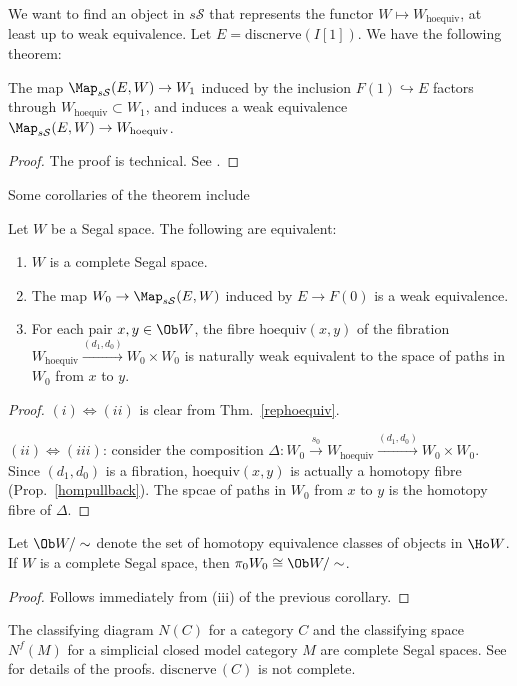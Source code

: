 We want to find an object in $s\mathcal S$ that represents the functor $W\mapsto W_{\mathrm{hoequiv}}$, at least up to weak equivalence. Let $E=\mathrm{discnerve}(I[1])$. We have the following theorem:
\begin{thm}\label{rephoequiv}
The map $\Map_{s\mathcal S}(E,W)\to W_1$ induced by the inclusion $F(1)\hookrightarrow E$ factors through $W_{\mathrm{hoequiv}}\subset W_1$, and induces a weak equivalence $\Map_{s\mathcal S}(E,W)\to W_{\mathrm{hoequiv}}$.
\end{thm}
\begin{proof}
The proof is technical. See \cite[Thm 6.2]{rezk}.
\end{proof}

Some corollaries of the theorem include
\begin{cor}\label{rephoequivcor}
Let $W$ be a Segal space. The following are equivalent:
\begin{enumerate}
\item $W$ is a complete Segal space.
\item The map $W_0\to\Map_{s\mathcal S}(E,W)$ induced by $E\to F(0)$ is a weak equivalence.
\item For each pair $x,y\in\Ob W$, the fibre $\mathrm{hoequiv}(x,y)$ of the fibration $W_{\mathrm{hoequiv}}\xrightarrow{(d_1,d_0)} W_0\times W_0$ is naturally weak equivalent to the space of paths in $W_0$ from $x$ to $y$.
\end{enumerate}
\end{cor}
\begin{proof}
$(i)\Leftrightarrow(ii)$ is clear from Thm.~\ref{rephoequiv}.

$(ii)\Leftrightarrow(iii)$: consider the composition $\Delta:W_0\xrightarrow{s_0}W_{\mathrm{hoequiv}}\xrightarrow{(d_1,d_0)} W_0\times W_0$. Since $(d_1,d_0)$ is a fibration, $\mathrm{hoequiv}(x,y)$ is actually a homotopy fibre (Prop.~\ref{hompullback}). The spcae of paths in $W_0$ from $x$ to $y$ is the homotopy fibre of $\Delta$.
\end{proof}

\begin{cor}
Let $\Ob W/\sim$ denote the set of homotopy equivalence classes of objects in $\Ho W$. If $W$ is a complete Segal space, then $\pi_0W_0\cong\Ob W/\sim$.
\end{cor}
\begin{proof}
Follows immediately from (iii) of the previous corollary.
\end{proof}

\begin{eg}
The classifying diagram $N(C)$ for a category $C$ and the classifying space $N^f(M)$ for a simplicial closed model category $M$ are complete Segal spaces. See \cite{rezk} for details of the proofs. $\mathrm{discnerve}\,(C)$ is not complete.
\end{eg}

